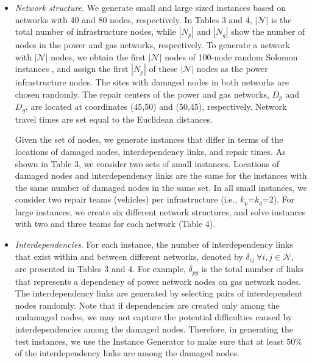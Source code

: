 \documentclass[11pt]{article}
\begin{document}
\begin{itemize}
\item \textit{Network structure}. We generate small and large sized instances based on networks with 40 and 80 nodes, respectively. In Tables 3 and 4, $|\mathcal{N}|$ is the total number of infrastructure nodes, while $|N_p|$ and $|N_g|$ show the number of nodes in the power and gas networks, respectively. To generate a network with $|\mathcal{N}|$ nodes, we obtain the first $|\mathcal{N}|$ nodes of  100-node random Solomon instances \citep{solomon1987algorithms}, and assign the first $|N_p|$ of these $|\mathcal{N}|$ nodes as the power infrastructure nodes. The sites with damaged nodes in both networks are chosen randomly. The repair centers of the power and gas networks, $D_p$ and $D_g$, are located at coordinates (45,50) and (50,45), respectively. Network travel times are set equal to the Euclidean distances.

Given the set of nodes, we generate instances that differ in terms of the locations of damaged nodes, interdependency links, and repair times. As shown in Table 3, we consider two sets of small instances. Locations of damaged nodes and interdependency links are the same for the instances with the same number of damaged nodes in the same set. In all small instances, we consider two repair teams (vehicles) per infrastructure (i.e., $k_{p}$=$k_{g}$=2). For large instances, we create six different network structures, and solve instances with two and three teams for each network (Table 4).



\item \textit{Interdependencies}. For each instance, the number of interdependency links that exist within and between different networks, denoted by $\delta_{ij} \: \forall i,j \in \mathcal{N}$, are presented in Tables 3 and 4. For example, $\delta_{pg}$ is the total number of links that represents a dependency of power network nodes on gas network nodes. The interdependency links are generated by selecting pairs of interdependent nodes randomly. Note that if dependencies are created only among the undamaged nodes, we may not capture the potential difficulties caused by interdependencies among the damaged nodes. Therefore, in generating the test instances, we use the Instance Generator to make sure that at least $50\%$ of the interdependency links are among the damaged nodes. 



\end{itemize}
\end{document}
